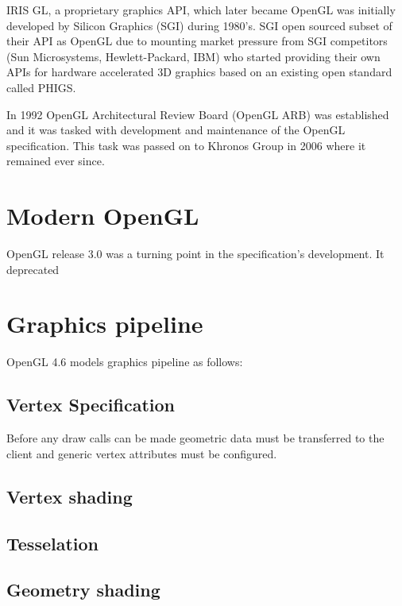 IRIS GL, a proprietary graphics API, which later became OpenGL was initially developed by Silicon Graphics (SGI) during 1980's. SGI open sourced subset of their API as OpenGL due to mounting market pressure from SGI competitors (Sun Microsystems, Hewlett-Packard, IBM) who started providing their own APIs for hardware accelerated 3D graphics based on an existing open standard called PHIGS.

In 1992 OpenGL Architectural Review Board (OpenGL ARB) was established and it was tasked with development and maintenance of the OpenGL specification. This task was passed on to Khronos Group in 2006 where it remained ever since.

\section{Modern OpenGL}


OpenGL release 3.0 was a turning point in the specification's development. It deprecated  

\section{Graphics pipeline}


OpenGL 4.6 models graphics pipeline as follows:

\subsection{Vertex Specification}

Before any draw calls can be made geometric data must be transferred to the client and generic vertex attributes must be configured.

\subsection{Vertex shading}

\subsection{Tesselation}

\subsection{Geometry shading}

